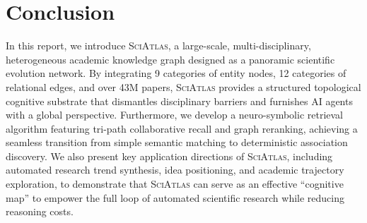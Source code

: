 \documentclass[11pt, a4paper]{lumia}
\newcommand{\ours}{\textsc{SciAtlas}}
\begin{document}
\section{Conclusion}
In this report, we introduce {\ours}, a large-scale, multi-disciplinary, heterogeneous academic knowledge graph designed as a panoramic scientific evolution network. By integrating 9 categories of entity nodes, 12 categories of relational edges, and over 43M papers, {\ours} provides a structured topological cognitive substrate that dismantles disciplinary barriers and furnishes AI agents with a global perspective. Furthermore, we develop a neuro-symbolic retrieval algorithm featuring tri-path collaborative recall and graph reranking, achieving a seamless transition from simple semantic matching to deterministic association discovery. We also present key application directions of {\ours}, including automated research trend synthesis, idea positioning, and academic trajectory exploration, to demonstrate that {\ours} can serve as an effective ``cognitive map'' to empower the full loop of automated scientific research while reducing reasoning costs.









\newpage
\appendix

\end{document}

